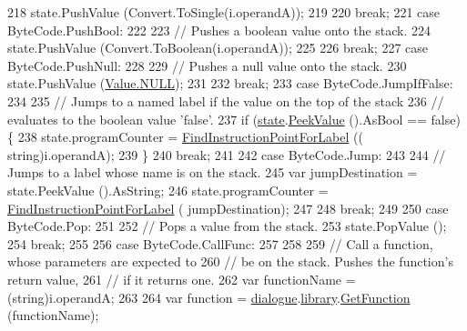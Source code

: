 \begin{DoxyCode}
218                 state.PushValue (Convert.ToSingle(i.operandA));
219 
220                 \textcolor{keywordflow}{break};
221             \textcolor{keywordflow}{case} ByteCode.PushBool:
222 
223                 \textcolor{comment}{// Pushes a boolean value onto the stack.}
224                 state.PushValue (Convert.ToBoolean(i.operandA));
225 
226                 \textcolor{keywordflow}{break};
227             \textcolor{keywordflow}{case} ByteCode.PushNull:
228 
229                 \textcolor{comment}{// Pushes a null value onto the stack.}
230                 state.PushValue (\hyperlink{a00163_a1ed2964965baca8621c45efa23f37660}{Value.NULL});
231 
232                 \textcolor{keywordflow}{break};
233             \textcolor{keywordflow}{case} ByteCode.JumpIfFalse:
234 
235                 \textcolor{comment}{// Jumps to a named label if the value on the top of the stack}
236                 \textcolor{comment}{// evaluates to the boolean value 'false'.}
237                 \textcolor{keywordflow}{if} (\hyperlink{a00138_a70f2ce6201cdd2430ceaa764ac614ca0}{state}.\hyperlink{a00141_a54fd5b64ec94e937e771846167242dc2}{PeekValue} ().AsBool == \textcolor{keyword}{false}) \{
238                     state.programCounter = \hyperlink{a00138_af613c8b2d098678b6ea05b509c0a0cb6}{FindInstructionPointForLabel} ((\textcolor{keywordtype}{
      string})i.operandA);
239                 \}
240                 \textcolor{keywordflow}{break};
241 
242             \textcolor{keywordflow}{case} ByteCode.Jump:
243 
244                 \textcolor{comment}{// Jumps to a label whose name is on the stack.}
245                 var jumpDestination = state.PeekValue ().AsString;
246                 state.programCounter = \hyperlink{a00138_af613c8b2d098678b6ea05b509c0a0cb6}{FindInstructionPointForLabel} (
      jumpDestination);
247 
248                 \textcolor{keywordflow}{break};
249 
250             \textcolor{keywordflow}{case} ByteCode.Pop:
251 
252                 \textcolor{comment}{// Pops a value from the stack.}
253                 state.PopValue ();
254                 \textcolor{keywordflow}{break};
255 
256             \textcolor{keywordflow}{case} ByteCode.CallFunc:
257 
258 
259                 \textcolor{comment}{// Call a function, whose parameters are expected to}
260                 \textcolor{comment}{// be on the stack. Pushes the function's return value,}
261                 \textcolor{comment}{// if it returns one.}
262                 var functionName = (string)i.operandA;
263 
264                 var \textcolor{keyword}{function} = \hyperlink{a00138_ac506426c503da5f033247c29e11c5e82}{dialogue}.\hyperlink{a00072_ae660d4cfb6e296358d2f61d8ee74c66a}{library}.\hyperlink{a00103_aacfb1f00ad8aa3921941b8d8af0960e0}{GetFunction} (functionName);

\end{DoxyCode}
